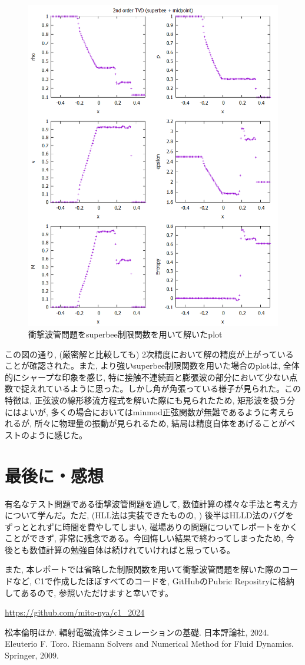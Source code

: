 \documentclass[dvipdfmx,b5paper]{jsarticle}
\begin{document}
\begin{figure}[H]
  \centering
  \includegraphics[width = 0.8\linewidth]{../book/chap03/11_shock-tude-superbee/01.png}
  \caption{衝撃波管問題をsuperbee制限関数を用いて解いたplot}
  \label{fig:superbee}
\end{figure}

この図の通り, (厳密解と比較しても) 2次精度において解の精度が上がっていることが確認された。また, より強いsuperbee制限関数を用いた場合のplotは, 全体的にシャープな印象を感じ, 特に接触不連続面と膨張波の部分において少ない点数で捉えれているように思った。しかし角が角張っている様子が見られた。この特徴は, 正弦波の線形移流方程式を解いた際にも見られたため, 矩形波を扱う分にはよいが, 多くの場合においてはminmod正弦関数が無難であるように考えられるが, 所々に物理量の振動が見られるため, 結局は精度自体をあげることがベストのように感じた。

\section{最後に・感想}
有名なテスト問題である衝撃波管問題を通して, 数値計算の様々な手法と考え方について学んだ。ただ, (HLL法は実装できたものの, ) 後半はHLLD法のバグをずっととれずに時間を費やしてしまい, 磁場ありの問題についてレポートをかくことができず, 非常に残念である。今回悔しい結果で終わってしまったため, 今後とも数値計算の勉強自体は続けれていければと思っている。

また, 本レポートでは省略した制限関数を用いて衝撃波管問題を解いた際のコードなど, C1で作成したほぼすべてのコードを, GitHubのPubric Repositryに格納してあるので, 参照いただけますと幸いです。

\url{https://github.com/mito-nya/c1_2024}

\begin{thebibliography}{9}
  松本倫明ほか. 輻射電磁流体シミュレーションの基礎. 日本評論社, 2024. 
  Eleuterio F. Toro. Riemann Solvers and Numerical Method for Fluid Dynamics. Springer, 2009.
\end{thebibliography}
\end{document}
